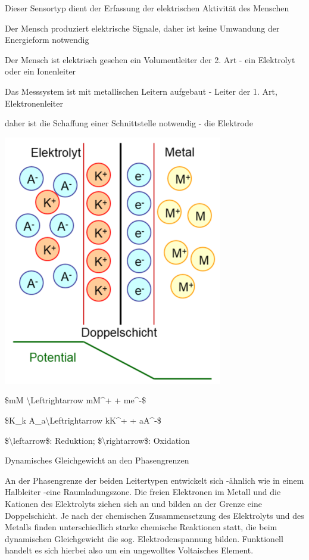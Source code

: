 \documentclass[a4paper]{article}
\begin{document}
\begin{multicols}{3}
  \begin{itemize*}
    \item Dieser Sensortyp dient der Erfassung der elektrischen Aktivität des Menschen
    \item Der Mensch produziert elektrische Signale, daher ist keine Umwandung der Energieform notwendig
    \item Der Mensch ist elektrisch gesehen ein Volumentleiter der 2. Art - ein Elektrolyt oder ein Ionenleiter
    \item Das Messsystem ist mit metallischen Leitern aufgebaut - Leiter der 1. Art, Elektronenleiter
    \item daher ist die Schaffung einer Schnittstelle notwendig - die Elektrode
    \item \includegraphics[width=.5\linewidth]{Assets/Biosignalverarbeitung-elektrochemische-grundlage.png}
    \begin{itemize*}
      \item \$mM \textbackslash Leftrightarrow mM\^{}+ + me\^{}-\$
      \item \$K\_k A\_a\textbackslash Leftrightarrow kK\^{}+ + aA\^{}-\$
      \item \$\textbackslash leftarrow\$: Reduktion; \$\textbackslash rightarrow\$: Oxidation
      \item Dynamisches Gleichgewicht an den Phasengrenzen
      \item An der Phasengrenze der beiden Leitertypen entwickelt sich -ähnlich wie in einem Halbleiter -eine Raumladungszone. Die freien Elektronen im Metall und die Kationen des Elektrolyts ziehen sich an und bilden an der Grenze eine Doppelschicht. Je nach der chemischen Zusammensetzung des Elektrolyts und des Metalls finden unterschiedlich starke chemische Reaktionen statt, die beim dynamischen Gleichgewicht die sog. Elektrodenspannung bilden. Funktionell handelt es sich hierbei also um ein ungewolltes Voltaisches Element.
    \end{itemize*}
  \end{itemize*}


\end{multicols}
\end{document}
